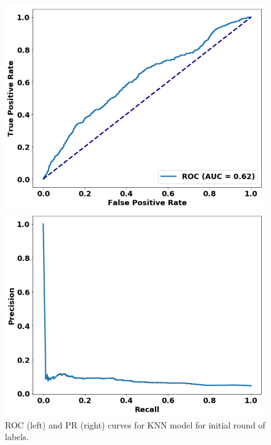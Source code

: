 \begin{figure}
\centering
\begin{minipage}[b]{.4\textwidth}
\includegraphics[trim=0in 0.1in 0.1in 0.in,clip,width=1.0\textwidth]{figures/roc_init.png}
\end{minipage}\qquad
\begin{minipage}[b]{.4\textwidth}
\includegraphics[trim=0in 0.1in 0.1in 0.in,clip,width=1.0\textwidth]{figures/prc_init.png}
\end{minipage}
\caption{ROC (left) and PR (right) curves for KNN model for initial round of labels.\label{fig:knn_init}}
\end{figure}

